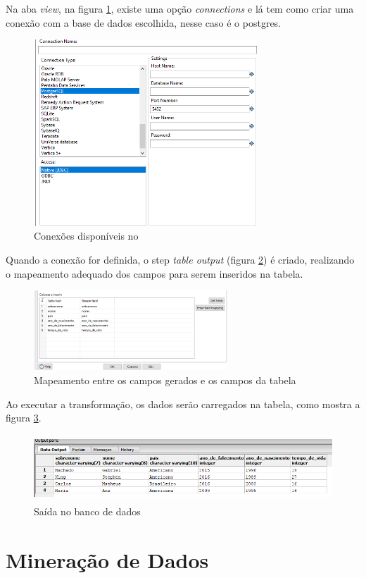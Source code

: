 Na aba \textit{view}, na figura \ref{database}, existe uma opção \textit{connections} e lá tem como criar uma conexão com a base de dados escolhida, nesse caso é o postgres.\\
\begin{figure}[H]
\centering
\includegraphics[height=7cm]{imagens/conexao.png}
\caption{Conexões disponíveis no \pdi}
\label{database}
\end{figure}
Quando a conexão for definida, o step \textit{table output }(figura \ref{outputtable}) é criado, realizando o mapeamento adequado dos campos para serem inseridos na tabela.
\begin{figure}[H]
\centering
\includegraphics[height=3cm]{imagens/tablemapping.png}
\caption{Mapeamento entre os campos gerados e os campos da tabela}
\label{outputtable}
\end{figure}
Ao executar a transformação, os dados serão carregados na tabela, como mostra a figura \ref{table}.
\begin{figure}[H]
\centering
\includegraphics[height=2.5cm]{imagens/saidasql.png}
\caption{Saída no banco de dados}
\label{table}
\end{figure}

\section{Mineração de Dados}

